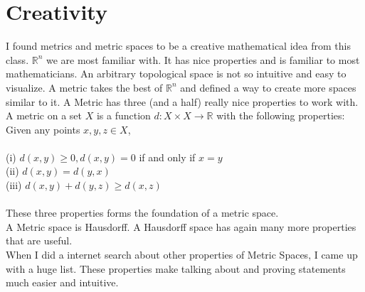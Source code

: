 \documentclass[12pt]{article}
\newcommand{\R}{\mathbb{R}}
\newcommand{\1}{^{-1}}
\begin{document}
	\section{Creativity}
	I found metrics and metric spaces to be a creative mathematical idea from this class. $ \R^n $ we are most familiar with. It has nice properties and is familiar to most mathematicians. An arbitrary topological space is not so intuitive and easy to visualize. A metric takes the best of $ \R^n $ and defined a way to create more spaces similar to it. A Metric has three (and a half) really nice properties to work with. A metric on a set $ X $ is a function $ d: X\times X \to \R $ with the following properties: Given any points $ x,y,z\in X $,\\
	\\
	(i) $ d(x,y) \geq 0 , d(x,y) = 0 $ if and only if $ x=y $\\
	(ii) $d(x,y)=d(y,x)$\\
	(iii) $d(x,y)+d(y,z) \geq d(x,z)$\\
	\\
	These three properties forms the foundation of a metric space.\\
	A Metric space is Hausdorff. A Hausdorff space has again many more properties that are useful.\\
	When I did a internet search about other properties of Metric Spaces, I came up with a huge list. These properties make talking about and proving statements much easier and intuitive.
\end{document}
